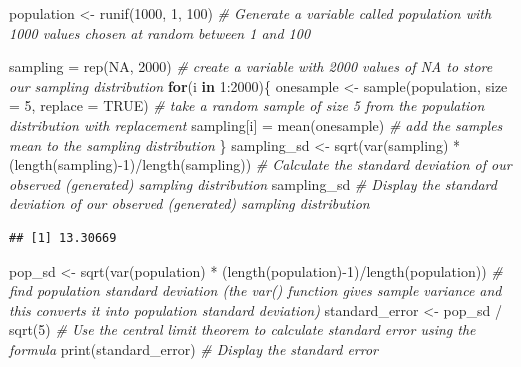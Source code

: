 \documentclass[
]{book}
\newenvironment{Shaded}{\begin{snugshade}}{\end{snugshade}}
\newcommand{\AttributeTok}[1]{\textcolor[rgb]{0.77,0.63,0.00}{#1}}
\newcommand{\CommentTok}[1]{\textcolor[rgb]{0.56,0.35,0.01}{\textit{#1}}}
\newcommand{\ConstantTok}[1]{\textcolor[rgb]{0.00,0.00,0.00}{#1}}
\newcommand{\ControlFlowTok}[1]{\textcolor[rgb]{0.13,0.29,0.53}{\textbf{#1}}}
\newcommand{\DecValTok}[1]{\textcolor[rgb]{0.00,0.00,0.81}{#1}}
\newcommand{\FunctionTok}[1]{\textcolor[rgb]{0.00,0.00,0.00}{#1}}
\newcommand{\NormalTok}[1]{#1}
\newcommand{\OtherTok}[1]{\textcolor[rgb]{0.56,0.35,0.01}{#1}}
\newcommand{\SpecialCharTok}[1]{\textcolor[rgb]{0.00,0.00,0.00}{#1}}
\begin{document}
\begin{Shaded}
\begin{Highlighting}[]
\NormalTok{population }\OtherTok{\textless{}{-}} \FunctionTok{runif}\NormalTok{(}\DecValTok{1000}\NormalTok{, }\DecValTok{1}\NormalTok{, }\DecValTok{100}\NormalTok{) }\CommentTok{\# Generate a variable called \textquotesingle{}population\textquotesingle{} with 1000 values chosen at random between 1 and 100}

\NormalTok{sampling }\OtherTok{=} \FunctionTok{rep}\NormalTok{(}\ConstantTok{NA}\NormalTok{, }\DecValTok{2000}\NormalTok{) }\CommentTok{\# create a variable with 2000 values of NA to store our sampling distribution}
\ControlFlowTok{for}\NormalTok{(i }\ControlFlowTok{in} \DecValTok{1}\SpecialCharTok{:}\DecValTok{2000}\NormalTok{)\{}
\NormalTok{  onesample }\OtherTok{\textless{}{-}} \FunctionTok{sample}\NormalTok{(population, }\AttributeTok{size =} \DecValTok{5}\NormalTok{, }\AttributeTok{replace =} \ConstantTok{TRUE}\NormalTok{) }\CommentTok{\# take a random sample of size 5 from the population distribution with replacement  }
\NormalTok{  sampling[i] }\OtherTok{=} \FunctionTok{mean}\NormalTok{(onesample) }\CommentTok{\# add the sample\textquotesingle{}s mean to the sampling distribution}
\NormalTok{\}}
\NormalTok{sampling\_sd }\OtherTok{\textless{}{-}} \FunctionTok{sqrt}\NormalTok{(}\FunctionTok{var}\NormalTok{(sampling) }\SpecialCharTok{*}\NormalTok{ (}\FunctionTok{length}\NormalTok{(sampling)}\SpecialCharTok{{-}}\DecValTok{1}\NormalTok{)}\SpecialCharTok{/}\FunctionTok{length}\NormalTok{(sampling)) }\CommentTok{\# Calculate the standard deviation of our observed (generated) sampling distribution}
\NormalTok{sampling\_sd }\CommentTok{\# Display the standard deviation of our observed (generated) sampling distribution}
\end{Highlighting}
\end{Shaded}

\begin{verbatim}
## [1] 13.30669
\end{verbatim}

\begin{Shaded}
\begin{Highlighting}[]
\NormalTok{pop\_sd }\OtherTok{\textless{}{-}} \FunctionTok{sqrt}\NormalTok{(}\FunctionTok{var}\NormalTok{(population) }\SpecialCharTok{*}\NormalTok{ (}\FunctionTok{length}\NormalTok{(population)}\SpecialCharTok{{-}}\DecValTok{1}\NormalTok{)}\SpecialCharTok{/}\FunctionTok{length}\NormalTok{(population)) }\CommentTok{\# find population standard deviation (the var() function gives sample variance and this converts it into population standard deviation)}
\NormalTok{standard\_error }\OtherTok{\textless{}{-}}\NormalTok{ pop\_sd }\SpecialCharTok{/} \FunctionTok{sqrt}\NormalTok{(}\DecValTok{5}\NormalTok{) }\CommentTok{\# Use the central limit theorem to calculate standard error using the formula}
\FunctionTok{print}\NormalTok{(standard\_error) }\CommentTok{\# Display the standard error}
\end{Highlighting}
\end{Shaded}
\end{document}
